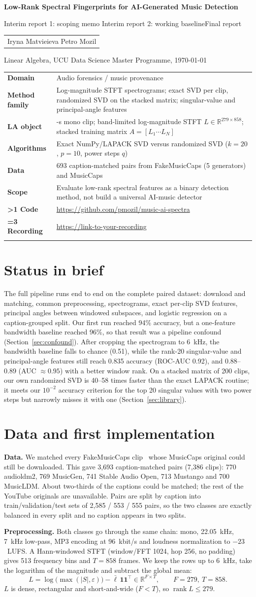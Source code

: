 \documentclass[11pt,a4paper]{article}
\makeatletter
\newcommand{\stage}{2}
\newcommand{\reporttitle}{Low-Rank Spectral Fingerprints for AI-Generated Music Detection}
\newcommand{\reportauthors}{Iryna Matvieieva \quad Petro Mozil}
\newcommand{\carddomain}{Audio forensics / music provenance}
\newcommand{\cardmethod}{Log-magnitude STFT spectrograms; exact SVD per clip, randomized SVD on the stacked matrix; singular-value and principal-angle features}
\newcommand{\cardobject}{10-s mono clip; band-limited log-magnitude STFT $L\in\mathbb{R}^{279\times858}$; stacked training matrix $A=[L_1\cdots L_N]$}
\newcommand{\cardalgorithms}{Exact NumPy/LAPACK SVD versus randomized SVD ($k=20$, $p=10$, power steps $q$)}
\newcommand{\carddata}{3{,}693 caption-matched pairs from FakeMusicCaps (5 generators) and MusicCaps~\cite{FakeMusicCaps}}
\newcommand{\cardreframing}{Evaluate low-rank spectral features as a binary detection method, not build a universal AI-music detector}
\newcommand{\cardcode}{\url{https://github.com/pmozil/music-ai-spectra}}
\newcommand{\cardvideo}{\url{https://link-to-your-recording}} %
\DeclareMathOperator{\rank}{rank}
\theoremstyle{plain}
\theoremstyle{definition}
\theoremstyle{remark}
\newcommand{\stagename}{\ifcase\stage\or Interim report 1: scoping memo\or
  Interim report 2: working baseline\or Final report\fi}
\newcommand{\projectcard}{%
  \noindent
  \begin{tabularx}{\linewidth}{@{}>{\raggedright\bfseries}p{3.0cm}
                                  >{\raggedright\arraybackslash}X@{}}
    \toprule
    Domain        & \carddomain \\
    Method family & \cardmethod \\
    LA object     & \cardobject \\
    Algorithms    & \cardalgorithms \\
    Data          & \carddata \\
    Scope         & \cardreframing \\
    \ifnum\stage>1 Code & \cardcode \\ \fi
    \ifnum\stage=3 Recording & \cardvideo \\ \fi
    \bottomrule
  \end{tabularx}\par}
\newcommand{\bodystart}{\label{body-start}}
\makeatother
\begin{document}
\bodystart
\begin{center}
  {\Large\bfseries \reporttitle\par}
  \medskip
  {\large \stagename\par}
  \smallskip
  \begin{tabular}{c}\reportauthors\end{tabular}\par
  \smallskip
  {\small Linear Algebra, UCU Data Science Master Programme, \today\par}
\end{center}
\projectcard
\smallskip

\section{Status in brief}
The full pipeline runs end to end on the complete paired dataset: download and
matching, common preprocessing, spectrograms, exact per-clip SVD
features, principal angles between windowed subspaces, and logistic
regression on a caption-grouped split. Our first run reached 94\% accuracy, but
a one-feature bandwidth baseline reached 96\%, so that result was a
pipeline confound (Section~\ref{sec:confound}). After cropping the spectrogram
to 6~kHz, the bandwidth baseline falls to chance (0.51), while the rank-20
singular-value and principal-angle features still reach 0.835 accuracy
(ROC-AUC 0.92), and 0.88--0.89 (AUC $\approx0.95$) with a better window
rank. On a stacked matrix of 200 clips, our own randomized SVD is 40--58 times
faster than the exact LAPACK routine; it meets our $10^{-2}$ accuracy
criterion for the top 20 singular values with two power steps but narrowly
misses it with one (Section~\ref{sec:library}).

\section{Data and first implementation}
\textbf{Data.} We matched every FakeMusicCaps clip~\cite{FakeMusicCaps} whose
MusicCaps original could still be downloaded. This gave 3{,}693 caption-matched
pairs (7{,}386 clips): 770 audioldm2, 769 MusicGen, 741 Stable Audio Open,
713 Mustango and 700 MusicLDM. About two-thirds of the captions could be matched;
the rest of the YouTube originals are unavailable. Pairs are split by caption
into train/validation/test sets of 2{,}585 / 553 / 555 pairs, so the two
classes are exactly balanced in every split and no caption appears in two splits.

\textbf{Preprocessing.} Both classes go through the same chain: mono, 22.05~kHz,
7~kHz low-pass, MP3 encoding at 96~kbit/s and loudness normalization to
$-23$~LUFS. A Hann-windowed STFT (window/FFT 1024, hop 256, no padding)
gives 513 frequency bins and $T=858$ frames. We keep the rows up to 6~kHz,
take the logarithm of the magnitude and subtract the global mean:
\[
  L=\log\bigl(\max(|S|,\varepsilon)\bigr)-\bar\ell\,\mathbf{1}\mathbf{1}^\top
  \in\mathbb{R}^{F\times T},\qquad F=279,\ T=858 .
\]
$L$ is dense, rectangular and short-and-wide ($F<T$), so $\rank L\le279$.
\end{document}
